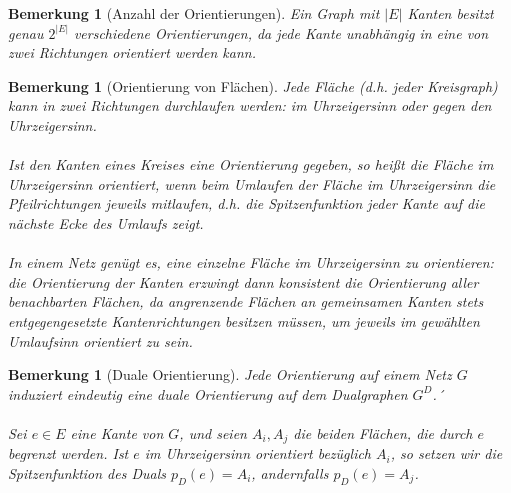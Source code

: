 \documentclass[11pt,a4paper,leqno]{report}
\newtheorem{remark}[theorem]{Bemerkung}
\numberwithin{equation}{chapter}
\begin{document}
\noindent
\begin{remark}[Anzahl der Orientierungen]
	Ein Graph mit $|E|$ Kanten besitzt genau $2^{|E|}$ verschiedene Orientierungen, da jede Kante unabhängig in eine von zwei Richtungen orientiert werden kann.
\end{remark}
\begin{remark}[Orientierung von Flächen]
	Jede Fläche (d.h. jeder Kreisgraph) kann in zwei Richtungen durchlaufen werden: 
	\emph{im Uhrzeigersinn} oder \emph{gegen den Uhrzeigersinn}.\\
	\\
	Ist den Kanten eines Kreises eine Orientierung gegeben, so heißt die Fläche \emph{im Uhrzeigersinn orientiert}, 
	wenn beim Umlaufen der Fläche im Uhrzeigersinn die Pfeilrichtungen jeweils mitlaufen, d.h. die Spitzenfunktion jeder Kante auf die nächste Ecke des Umlaufs zeigt. \\
	\\
	In einem Netz genügt es, eine einzelne Fläche im Uhrzeigersinn zu orientieren:  
	die Orientierung der Kanten erzwingt dann konsistent die Orientierung aller benachbarten Flächen, 
	da angrenzende Flächen an gemeinsamen Kanten stets entgegengesetzte Kantenrichtungen besitzen müssen, um jeweils im gewählten Umlaufsinn orientiert zu sein.
\end{remark}

 \begin{remark}[Duale Orientierung]
 	Jede Orientierung auf einem Netz $G$ induziert eindeutig eine \emph{duale Orientierung} auf dem Dualgraphen $G^D$.´\\
 	\\
 	Sei $e \in E$ eine Kante von $G$, und seien $A_i, A_j$ die beiden Flächen, die durch $e$ begrenzt werden. Ist $e$ im Uhrzeigersinn orientiert bezüglich $A_i$, so setzen wir die Spitzenfunktion des Duals $p_D(e)=A_i$, 
 	andernfalls $p_D(e)=A_j$.
 \end{remark}
\end{document}
